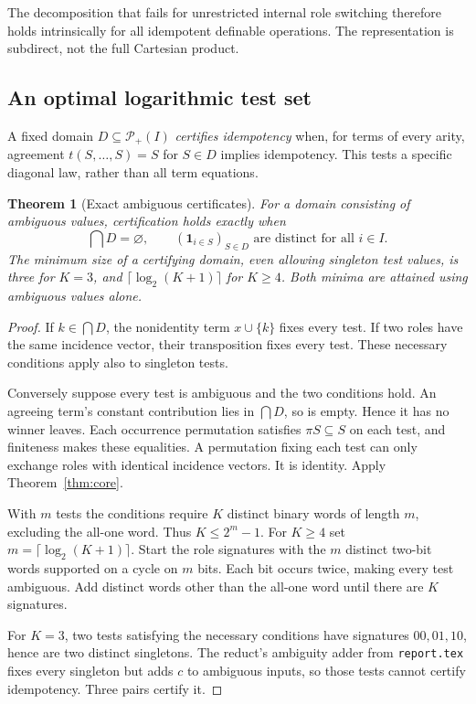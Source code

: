 \documentclass[11pt]{article}
\newtheorem{theorem}{Theorem}[section]
\newcommand{\Pow}{\mathcal P_+}
\begin{document}
The decomposition that fails for unrestricted internal role switching
therefore holds intrinsically for all idempotent definable operations.
The representation is subdirect, not the full Cartesian product.

\subsection{An optimal logarithmic test set}

A fixed domain $D\subseteq\Pow(I)$ \emph{certifies idempotency} when,
for terms of every arity, agreement $t(S,\ldots,S)=S$ for $S\in D$
implies idempotency. This tests a specific diagonal law, rather than
all term equations.

\begin{theorem}[Exact ambiguous certificates]\label{thm:idem-domain}
For a domain consisting of ambiguous values, certification holds exactly
when
\[
 \bigcap D=\varnothing,\qquad
 (\mathbf1_{i\in S})_{S\in D}\text{ are distinct for all }i\in I.
\]
The minimum size of a certifying domain, even allowing singleton test
values, is three for $K=3$, and $\lceil\log_2(K+1)\rceil$ for $K\geq4$.
Both minima are attained using ambiguous values alone.
\end{theorem}
\begin{proof}
If $k\in\bigcap D$, the nonidentity term $x\cup\{k\}$ fixes every test.
If two roles have the same incidence vector, their transposition fixes
every test. These necessary conditions apply also to singleton tests.

Conversely suppose every test is ambiguous and the two conditions hold.
An agreeing term's constant contribution lies in $\bigcap D$, so is
empty. Hence it has no winner leaves. Each occurrence permutation
satisfies $\pi S\subseteq S$ on each test, and finiteness makes these
equalities. A permutation fixing each test can only exchange roles with
identical incidence vectors. It is identity. Apply Theorem~\ref{thm:core}.

With $m$ tests the conditions require $K$ distinct binary words of
length $m$, excluding the all-one word. Thus $K\leq2^m-1$. For $K\geq4$
set $m=\lceil\log_2(K+1)\rceil$. Start the role signatures with the $m$
distinct two-bit words supported on a cycle on $m$ bits. Each bit occurs
twice, making every test ambiguous. Add distinct words other than the
all-one word until there are $K$ signatures.

For $K=3$, two tests satisfying the necessary conditions have signatures
$00,01,10$, hence are two distinct singletons. The reduct's ambiguity
adder from \texttt{report.tex} fixes every singleton but adds $c$ to
ambiguous inputs, so those tests cannot certify idempotency.
Three pairs certify it.
\end{proof}
\end{document}
